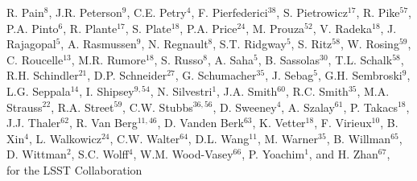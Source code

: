 {R. Pain$^{8}$,
J.R. Peterson$^{9}$,
C.E. Petry$^{4}$,  
F. Pierfederici$^{38}$,
S. Pietrowicz$^{17}$,
R. Pike$^{57}$,
P.A. Pinto$^{6}$,   
R. Plante$^{17}$,
S. Plate$^{18}$, 
P.A. Price$^{24}$,
M. Prouza$^{52}$,
V. Radeka$^{18}$, 
J. Rajagopal$^5$,   
A. Rasmussen$^9$,
N. Regnault$^8$,  
S.T. Ridgway$^5$, 
S. Ritz$^{58}$, 
W. Rosing$^{59}$,
C. Roucelle$^{13}$, 
M.R. Rumore$^{18}$, 
S. Russo$^8$,  
A. Saha$^{5}$,     
B. Sassolas$^{30}$, 
T.L. Schalk$^{58}$,     
R.H. Schindler$^{21}$,
D.P. Schneider$^{27}$,    
G. Schumacher$^{35}$,
J. Sebag$^5$,
G.H. Sembroski$^9$, 
L.G. Seppala$^{14}$,
I. Shipsey$^{9,54}$,
N. Silvestri$^1$,
J.A. Smith$^{60}$,    
R.C. Smith$^{35}$,
M.A. Strauss$^{22}$, 
R.A. Street$^{59}$,    
C.W. Stubbs$^{36,56}$,
D. Sweeney$^4$,
A. Szalay$^{61}$,
P. Takacs$^{18}$, 
J.J. Thaler$^{62}$,
R. Van Berg$^{11,46}$, 
D. Vanden Berk$^{63}$,  
K. Vetter$^{18}$, 
F. Virieux$^{10}$, 
B. Xin$^4$,
L. Walkowicz$^{24}$,
C.W. Walter$^{64}$, 
D.L. Wang$^{11}$,
M. Warner$^{35}$,
B. Willman$^{65}$,
D. Wittman$^2$,
S.C. Wolff$^4$, 
W.M. Wood-Vasey$^{66}$,  
P. Yoachim$^1$,
and H. Zhan$^{67}$, \\
for the LSST Collaboration
}
\affil{}

